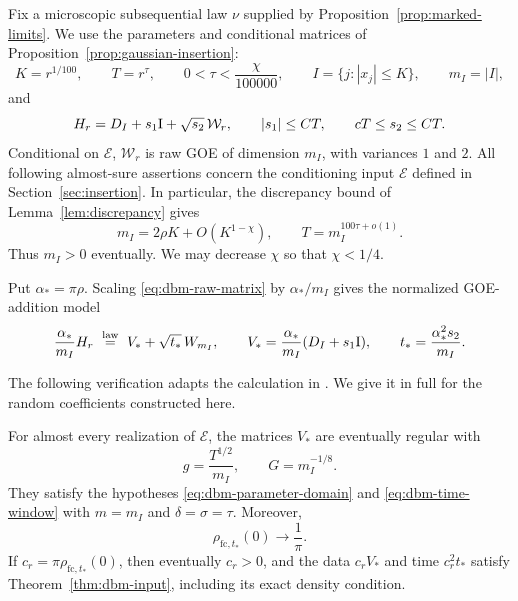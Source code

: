 Fix a microscopic subsequential law \(\nu\) supplied by
Proposition~\ref{prop:marked-limits}. We use the parameters and
conditional matrices of Proposition~\ref{prop:gaussian-insertion}:
\[
 K=r^{1/100},\qquad T=r^\tau,\qquad
 0<\tau<\frac{\chi}{100000},\qquad
 I=\{j:|x_j|\le K\},\qquad m_I=|I|,
\]
and
\begin{equation}
 \label{eq:dbm-raw-matrix}
 H_r=D_I+s_1\mathrm I+\sqrt{s_2}\,\mathcal W_r,
 \qquad |s_1|\le C T,\qquad cT\le s_2\le CT.
\end{equation}
Conditional on \(\mathcal E\), \(\mathcal W_r\) is raw GOE of dimension
\(m_I\), with variances \(1\) and \(2\). All following almost-sure
assertions concern the conditioning input \(\mathcal E\) defined in
Section~\ref{sec:insertion}. In particular,
the discrepancy bound of Lemma~\ref{lem:discrepancy} gives
\begin{equation}
 \label{eq:dbm-dimension}
 m_I=2\rho K+O(K^{1-\chi}),
 \qquad
 T=m_I^{100\tau+o(1)}.
\end{equation}
Thus \(m_I>0\) eventually. We may decrease \(\chi\) so that
\(\chi<1/4\).

Put \(\alpha_*=\pi\rho\). Scaling \eqref{eq:dbm-raw-matrix} by
\(\alpha_*/m_I\) gives the normalized GOE-addition model
\begin{equation}
 \label{eq:dbm-normalized-matrix}
 \frac{\alpha_*}{m_I}H_r
   \ \stackrel{\mathrm{law}}{=}\
       V_*+\sqrt{t_*}\,W_{m_I},
 \qquad
 V_*=\frac{\alpha_*}{m_I}(D_I+s_1\mathrm I),
 \qquad
 t_*=\frac{\alpha_*^2s_2}{m_I}.
\end{equation}

The following verification adapts the calculation in
\cite[Section~6.2]{bu}. We give it in full for the random coefficients
constructed here.

\begin{lemma}
\label{lem:density-adjustment}
For almost every realization of \(\mathcal E\), the matrices \(V_*\) are eventually regular
with
\[
 g=\frac{T^{1/2}}{m_I},\qquad G=m_I^{-1/8}.
\]
They satisfy the hypotheses
\eqref{eq:dbm-parameter-domain} and \eqref{eq:dbm-time-window} with
\(m=m_I\) and \(\delta=\sigma=\tau\). Moreover,
\[
 \rho_{\mathrm{fc},t_*}(0)\longrightarrow\frac1\pi.
\]
If \(c_r=\pi\rho_{\mathrm{fc},t_*}(0)\), then eventually \(c_r>0\),
and the data \(c_rV_*\) and time \(c_r^2t_*\) satisfy
Theorem~\ref{thm:dbm-input}, including its exact density condition.
\end{lemma}

